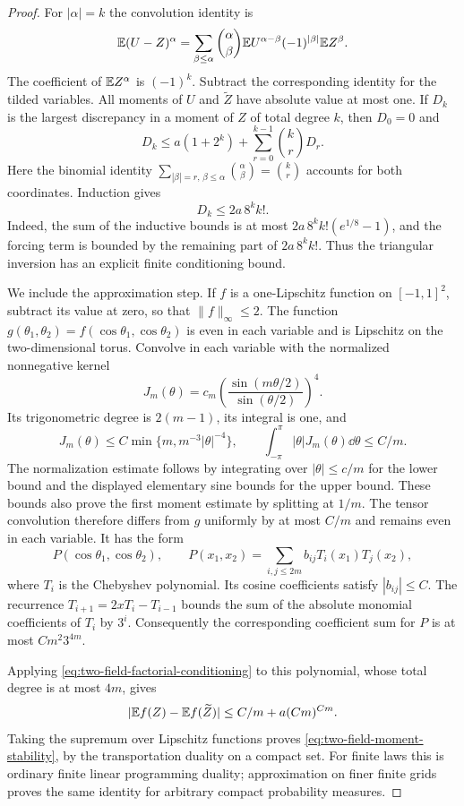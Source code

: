 \begin{proof}
For $|\alpha|=k$ the convolution identity is
\begin{equation}\label{eq:two-field-triangular-moments}
 \mathbb E(U-Z)^\alpha
   =\sum_{\beta\le\alpha}\binom{\alpha}{\beta}
        \mathbb E U^{\alpha-\beta}(-1)^{|\beta|}\mathbb E Z^\beta.
\end{equation}
The coefficient of $\mathbb E Z^\alpha$ is $(-1)^k$.  Subtract the
corresponding identity for the tilded variables.  All moments of
$U$ and $\widetilde Z$ have absolute value at most one.  If $D_k$
is the largest discrepancy in a moment of $Z$ of total degree $k$,
then $D_0=0$ and
\[
 D_k\le a(1+2^k)+\sum_{r=0}^{k-1}\binom{k}{r}D_r.
\]
Here the binomial identity
$\sum_{|\beta|=r,\,\beta\le\alpha}\binom{\alpha}{\beta}
=\binom{k}{r}$ accounts for both coordinates.  Induction gives
\begin{equation}\label{eq:two-field-factorial-conditioning}
                         D_k\le 2a\,8^k k!.
\end{equation}
Indeed, the sum of the inductive bounds is at most
$2a\,8^k k!(e^{1/8}-1)$, and the forcing term is bounded by the
remaining part of $2a\,8^k k!$.  Thus the triangular inversion has
an explicit finite conditioning bound.

We include the approximation step.  If $f$ is a one-Lipschitz
function on $[-1,1]^2$, subtract its value at zero, so that
$\|f\|_\infty\le2$.  The function
$g(\theta_1,\theta_2)=f(\cos\theta_1,\cos\theta_2)$ is even
in each variable and is Lipschitz on the two-dimensional torus.
Convolve in each variable with the normalized nonnegative kernel
\[
 J_m(\theta)=c_m
       \left(\frac{\sin(m\theta/2)}{\sin(\theta/2)}\right)^4.
\]
Its trigonometric degree is $2(m-1)$, its integral is one, and
\[
 J_m(\theta)\le C\min\{m,m^{-3}|\theta|^{-4}\},\qquad
                 \int_{-\pi}^{\pi}|\theta|J_m(\theta)\dd\theta
                         \le C/m.
\]
The normalization estimate follows by integrating over
$|\theta|\le c/m$ for the lower bound and the displayed elementary
sine bounds for the upper bound.  These bounds also prove the first
moment estimate by splitting at $1/m$.  The tensor convolution
therefore differs from $g$ uniformly by at most $C/m$ and remains
even in each variable.  It has the form
\[
 P(\cos\theta_1,\cos\theta_2),\qquad
 P(x_1,x_2)=\sum_{i,j\le2m}b_{ij}T_i(x_1)T_j(x_2),
\]
where $T_i$ is the Chebyshev polynomial.  Its cosine coefficients
satisfy $|b_{ij}|\le C$.  The recurrence
$T_{i+1}=2xT_i-T_{i-1}$ bounds the sum of the absolute monomial
coefficients of $T_i$ by $3^i$.  Consequently the corresponding
coefficient sum for $P$ is at most $Cm^2 3^{4m}$.

Applying \eqref{eq:two-field-factorial-conditioning} to this
polynomial, whose total degree is at most $4m$, gives
\[
 |\mathbb E f(Z)-\mathbb E f(\widetilde Z)|
       \le C/m+a(Cm)^{Cm}.
\]
Taking the supremum over Lipschitz functions proves
\eqref{eq:two-field-moment-stability}, by the transportation duality
on a compact set.  For finite laws this is ordinary finite linear
programming duality; approximation on finer finite grids proves the
same identity for arbitrary compact probability measures.
\end{proof}

